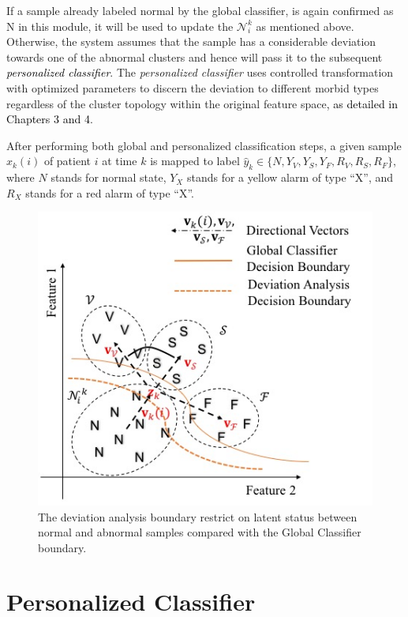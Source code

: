If a sample already labeled normal by the global classifier, is again confirmed as N in this module, it will be used to update the $\mathcal{N}_i^k$ as mentioned above. Otherwise, the system assumes that the sample has a considerable deviation towards one of the abnormal clusters and hence will pass it to the subsequent \textcolor{black}{\textit{personalized classifier}}. The \textit{personalized classifier} uses controlled transformation with optimized parameters to discern the deviation to different morbid types regardless of the cluster topology within the original feature space\textcolor{black}{, as detailed in Chapters 3 and 4}. 

After performing both global and personalized classification steps, a given sample $x_k(i)$ of patient $i$ at time $k$ is mapped to label $\hat{y}_k \in \{N,Y_V,Y_S,Y_F,R_V,R_S,R_F\}$, where $N$ stands for normal state, $Y_X$ stands for a yellow alarm of type ``X'', and $R_X$ stands for a red alarm of type ``X''.

\begin{figure}[t]
\centering
\includegraphics[scale=.7]{Fig/topology.jpg}
\caption{The deviation analysis boundary restrict on latent status between normal and abnormal samples compared with the Global Classifier boundary.}
\label{fig:topo_deviation}
\end{figure}


\section{Personalized Classifier} %

